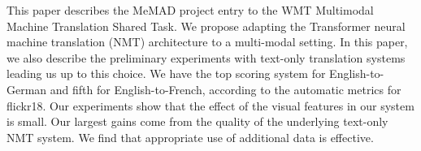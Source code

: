 This paper describes the MeMAD project entry to the WMT Multimodal Machine Translation Shared Task. We propose adapting the Transformer neural machine translation (NMT) architecture to a multi-modal setting. In this paper, we also describe the preliminary experiments with text-only translation systems leading us up to this choice. We have the top scoring system for English-to-German and fifth for English-to-French, according to the automatic metrics for flickr18. Our experiments show that the effect of the visual features in our system is small. Our largest gains come from the quality of the underlying text-only NMT system. We find that appropriate use of additional data is effective.
